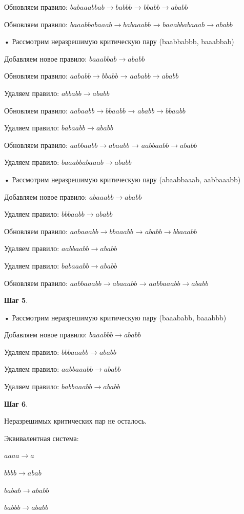 \documentclass[a4paper, 14pt]{extarticle}
\begin{document}
    Обновляем правило: $babaaabbab \to babbb$ → $bbabb \to ababb$

    Обновляем правило: $baaabbabaaab \to babaaabb$ → $baaabbabaaab \to ababb$

   • Рассмотрим неразрешимую критическую пару (baabbabbb, baaabbab)

        Добавляем новое правило: $baaabbab \to ababb$

    Обновляем правило: $aababb \to bbabb$ → $aababb \to ababb$

    Удаляем правило: $abbabb \to ababb$

    Обновляем правило: $aabaabb \to bbaabb$ → $ababb \to bbaabb$

    Удаляем правило: $babaabb \to ababb$

    Обновляем правило: $aabbaabb \to abaabb$ → $aabbaabb \to ababb$

    Удаляем правило: $baaabbabaaab \to ababb$

   • Рассмотрим неразрешимую критическую пару (abaabbaaab, aabbaaabb)

        Добавляем новое правило: $abaaabb \to ababb$

    Удаляем правило: $bbbaabb \to ababb$

    Обновляем правило: $aabaaabb \to bbaaabb$ → $ababb \to bbaaabb$

    Удаляем правило: $aabbaabb \to ababb$

    Удаляем правило: $babaaabb \to ababb$

    Обновляем правило: $aabbaaabb \to abaaabb$ → $aabbaaabb \to ababb$


 \textbf{Шаг 5}.

   • Рассмотрим неразрешимую критическую пару (baaababb, baaabbb)

        Добавляем новое правило: $baaabbb \to ababb$

    Удаляем правило: $bbbaaabb \to ababb$

    Удаляем правило: $aabbaaabb \to ababb$

    Удаляем правило: $babbaaabb \to ababb$


 \textbf{Шаг 6}.

Неразрешимых критических пар не осталось. 

Эквивалентная система:

$aaaa \to a$

$bbbb \to abab$

$babab \to ababb$

$babbb \to ababb$
\end{document}
